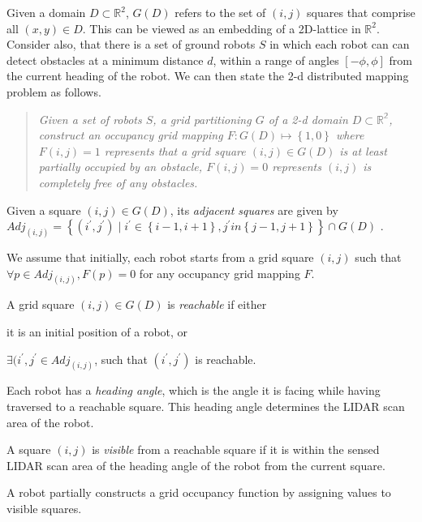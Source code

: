 Given a domain $D\subset\mathbb{R}^2$, $G(D)$ refers to the set of $(i,j)$ squares that comprise all $(x,y)\in D$. This can be viewed as an embedding of a 2D-lattice in $\mathbb{R}^2$. Consider also, that there is a set of ground robots $S$ in which each robot can can detect obstacles at a minimum distance $d$, within a range of angles $\left[-\phi,\phi\right]$ from the current heading of the robot. We can then state the 2-d distributed mapping problem as follows. \begin{quote}
 {\em Given a set of robots $S$, a grid partitioning $G$ of a 2-d domain $D\subset \mathbb{R^2}$, construct an occupancy grid mapping $F: G(D) \mapsto \left\{1,0\right\}$ where $F(i,j) = 1$ represents that a grid square $(i,j)\in G(D)$ is at least partially occupied by an obstacle, $F(i,j) = 0$ represents $(i,j)$ is completely free of any obstacles.}
\end{quote}
\begin{definition}
Given a square $(i,j) \in G(D)$, its \emph{adjacent squares} are given by
$\mathit{Adj}_{(i,j)} = \left\{(i^\prime, j^\prime) \mid i^\prime \in \left\{i - 1, i +1\right\}, j^\prime in \left\{j-1,j+1\right\} \right\} \cap G(D)$ .\end{definition} 
We assume that initially, each robot starts from a grid square $(i,j)$ such that $\forall p \in \mathit{Adj}_{(i,j)}, F(p) = 0$ for any occupancy grid mapping $F$.  

\begin{definition}
A grid square $(i,j)\in G(D)$ is \emph{reachable} if either \begin{inparaenum}[(a)]
\item it is an initial position of a robot, or 
\item $\exists (i^\prime,j^\prime \in \mathit{Adj}_{(i,j)} $, such that $(i^\prime, j^\prime)$ is reachable. 
\end{inparaenum}
\end{definition}
Each robot has a \emph{heading angle}, which is the angle it is facing while having traversed to a reachable square. This heading angle determines the LIDAR scan area of the robot.  
\begin{definition}
A square $(i,j)$ is \emph{visible} from a reachable square if it is within the sensed LIDAR scan area of the heading angle of the robot from the current square.  
\end{definition}
A robot partially constructs a grid occupancy function by assigning values to visible squares.

